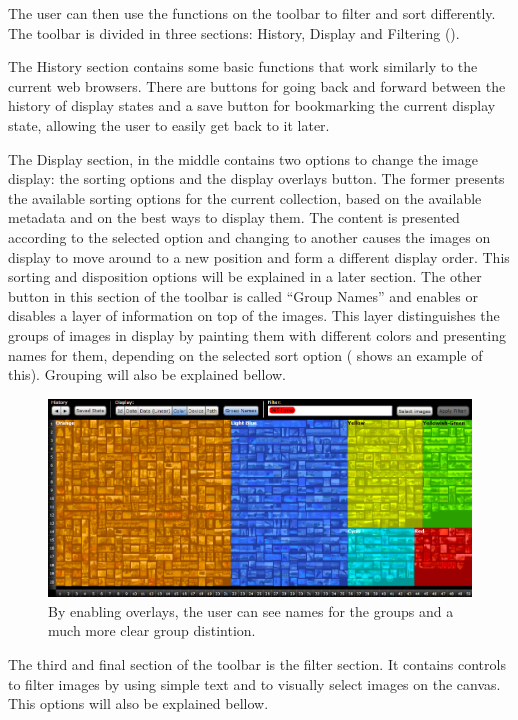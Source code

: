 The user can then use the functions on the toolbar to filter and sort differently. The toolbar is divided in three sections: History, Display and Filtering ().

The History section contains some basic functions that work similarly to the current web browsers. There are buttons for going back and forward between the history of display states and a save button for bookmarking the current display state, allowing the user to easily get back to it later.

The Display section, in the middle contains two options to change the image display: the sorting options and the display overlays button. The former presents the available sorting options for the current collection, based on the available metadata and on the best ways to display them. The content is presented according to the selected option and changing to another causes the images on display to move around to a new position and form a different display order. This sorting and disposition options will be explained in a later section.
The other button in this section of the toolbar is called ``Group Names'' and enables or disables a layer of information on top of the images. This layer distinguishes the groups of images in display by painting them with different colors and presenting names for them, depending on the selected sort option ( shows an example of this). Grouping will also be explained bellow. 

\begin{figure}[htbp]
	\centering
		\includegraphics[width=\linewidth]{Figures/overlays.png}
	\caption{By enabling overlays, the user can see names for the groups and a much more clear group distintion.}
	\label{fig:overlays}
\end{figure}

The third and final section of the toolbar is the filter section. It contains controls to filter images by using simple text and to visually select images on the canvas. This options will also be explained bellow.

